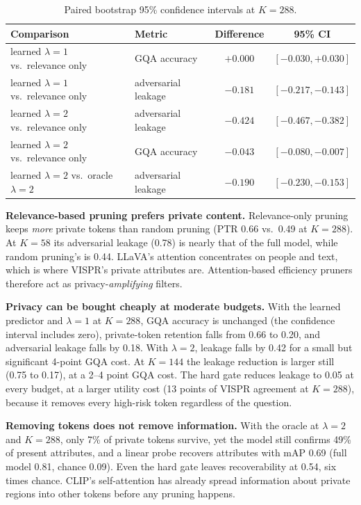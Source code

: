 \documentclass{article}
\begin{document}
\begin{table}[h]
\centering\small
\caption{Paired bootstrap 95\% confidence intervals at $K=288$.}
\label{tab:ci}
\begin{tabular}{@{}llcc@{}}
\toprule
Comparison & Metric & Difference & 95\% CI \\
\midrule
learned $\lambda=1$ vs.\ relevance only & GQA accuracy & $+0.000$ & $[-0.030, +0.030]$ \\
learned $\lambda=1$ vs.\ relevance only & adversarial leakage & $-0.181$ & $[-0.217, -0.143]$ \\
learned $\lambda=2$ vs.\ relevance only & adversarial leakage & $-0.424$ & $[-0.467, -0.382]$ \\
learned $\lambda=2$ vs.\ relevance only & GQA accuracy & $-0.043$ & $[-0.080, -0.007]$ \\
learned $\lambda=2$ vs.\ oracle $\lambda=2$ & adversarial leakage & $-0.190$ & $[-0.230, -0.153]$ \\
\bottomrule
\end{tabular}
\end{table}

\textbf{Relevance-based pruning prefers private content.} Relevance-only pruning keeps \emph{more} private tokens than random pruning
(PTR 0.66 vs.\ 0.49 at $K=288$). At $K=58$ its adversarial leakage (0.78) is nearly that of the full model, while random pruning's is 0.44.
LLaVA's attention concentrates on people and text, which is where VISPR's private attributes are. Attention-based efficiency pruners therefore
act as privacy-\emph{amplifying} filters.

\textbf{Privacy can be bought cheaply at moderate budgets.} With the learned predictor and $\lambda=1$ at $K=288$, GQA accuracy is unchanged
(the confidence interval includes zero), private-token retention falls from 0.66 to 0.20, and adversarial leakage falls by 0.18. With $\lambda=2$,
leakage falls by 0.42 for a small but significant 4-point GQA cost. At $K=144$ the leakage reduction is larger still (0.75 to 0.17), at a 2--4 point GQA cost.
The hard gate reduces leakage to 0.05 at every budget, at a larger utility cost (13 points of VISPR agreement at $K=288$), because it removes every
high-risk token regardless of the question.

\textbf{Removing tokens does not remove information.} With the oracle at $\lambda=2$ and $K=288$, only 7\% of private tokens survive, yet the model
still confirms 49\% of present attributes, and a linear probe recovers attributes with mAP 0.69 (full model 0.81, chance 0.09). Even the hard gate leaves
recoverability at 0.54, six times chance. CLIP's self-attention has already spread information about private regions into other tokens before any pruning happens.
\end{document}
